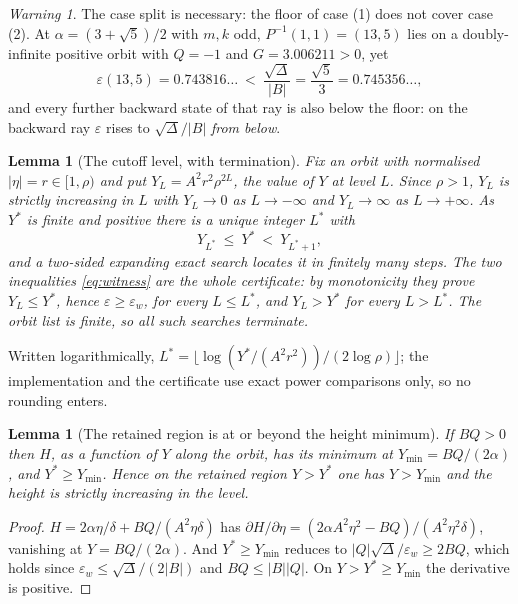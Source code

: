\documentclass[11pt]{article}
\newtheorem{lemma}[theorem]{Lemma}
\theoremstyle{definition}
\theoremstyle{remark}
\newtheorem{warning}[theorem]{Warning}
\newcommand{\dd}{\delta}
\newcommand{\epsw}{\varepsilon_w}
\begin{document}
\begin{warning}\label{warn:floor}
The case split is necessary: the floor of case (1) does not cover case (2). At
$\alpha=(3+\sqrt5)/2$ with $m,k$ odd, $P^{-1}(1,1)=(13,5)$ lies on a doubly-infinite positive
orbit with $Q=-1$ and $G=3.006211>0$, yet
\[
\varepsilon(13,5)=0.743816\ldots\ <\ \frac{\sqrt\Delta}{|B|}=\frac{\sqrt5}{3}=0.745356\ldots,
\]
and every further backward state of that ray is also below the floor: on the backward ray
$\varepsilon$ rises to $\sqrt\Delta/|B|$ \emph{from below}.
\end{warning}

\begin{lemma}[The cutoff level, with termination]\label{lem:cutlevel}
Fix an orbit with normalised $|\eta|=r\in[1,\rho)$ and put $Y_L=A^2r^2\rho^{2L}$, the value of
$Y$ at level $L$. Since $\rho>1$, $Y_L$ is strictly increasing in $L$ with $Y_L\to0$ as
$L\to-\infty$ and $Y_L\to\infty$ as $L\to+\infty$. As $Y^{*}$ is finite and positive there is a
\emph{unique} integer $L^{*}$ with
\begin{equation}\label{eq:witness}
Y_{L^{*}}\ \le\ Y^{*}\ <\ Y_{L^{*}+1},
\end{equation}
and a two-sided expanding exact search locates it in finitely many steps. The two inequalities
\eqref{eq:witness} are the whole certificate: by monotonicity they prove $Y_L\le Y^{*}$, hence
$\varepsilon\ge\epsw$, for \emph{every} $L\le L^{*}$, and $Y_L>Y^{*}$ for every $L>L^{*}$. The
orbit list is finite, so all such searches terminate.
\end{lemma}

Written logarithmically, $L^{*}=\bigl\lfloor\log(Y^{*}/(A^2r^2))/(2\log\rho)\bigr\rfloor$; the
implementation and the certificate use exact power comparisons only, so no rounding enters.

\begin{lemma}[The retained region is at or beyond the height minimum]\label{lem:ymin}
If $BQ>0$ then $H$, as a function of $Y$ along the orbit, has its minimum at
$Y_{\min}=BQ/(2\alpha)$, and $Y^{*}\ge Y_{\min}$. Hence on the retained region $Y>Y^{*}$ one
has $Y>Y_{\min}$ and the height is strictly increasing in the level.
\end{lemma}

\begin{proof}
$H=2\alpha\eta/\dd+BQ/(A^2\eta\dd)$ has $\partial H/\partial\eta=(2\alpha A^2\eta^2-BQ)/
(A^2\eta^2\dd)$, vanishing at $Y=BQ/(2\alpha)$. And $Y^{*}\ge Y_{\min}$ reduces to
$|Q|\sqrt\Delta/\epsw\ge2BQ$, which holds since $\epsw\le\sqrt\Delta/(2|B|)$ and
$BQ\le|B||Q|$. On $Y>Y^{*}\ge Y_{\min}$ the derivative is positive.
\end{proof}
\end{document}

